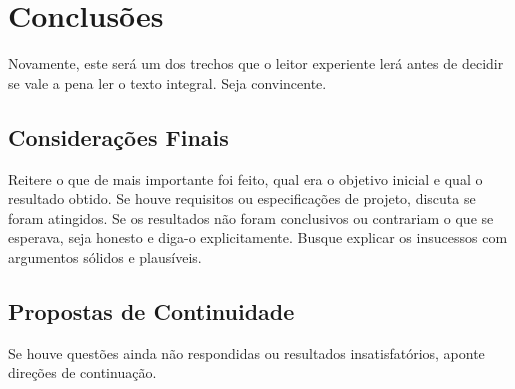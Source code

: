 \chapter{Conclusões}
\label{chap:conclusao}

Novamente, este será um dos trechos que o leitor experiente lerá antes de decidir se vale a pena ler o texto integral. Seja convincente.

\section{Considerações Finais}

Reitere o que de mais importante foi feito, qual era o objetivo inicial e qual o resultado obtido. Se houve requisitos ou especificações de projeto, discuta se foram atingidos. Se os resultados não foram conclusivos ou contrariam o que se esperava, seja honesto e diga-o explicitamente. Busque explicar os insucessos com argumentos sólidos e plausíveis. 

\section{Propostas de Continuidade}

Se houve questões ainda não respondidas ou resultados insatisfatórios, aponte direções de continuação.

\clearpage
